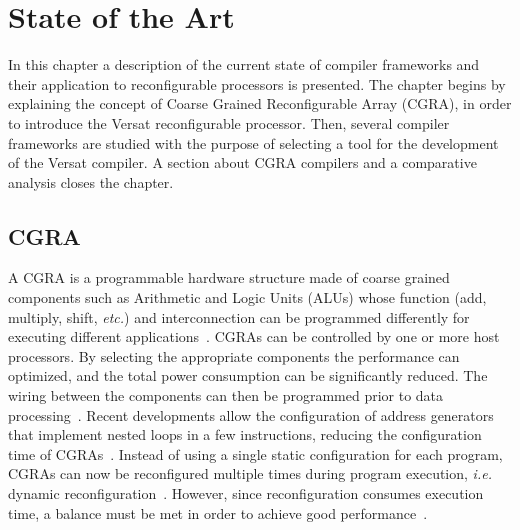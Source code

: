 
\chapter{State of the Art} %
\label{chapter:estadodaarte}

In this chapter a description of the current state of compiler frameworks and
their application to reconfigurable processors is presented. The chapter begins
by explaining the concept of Coarse Grained Reconfigurable Array ({\sc CGRA}), in
order to introduce the Versat reconfigurable processor. Then, several compiler
frameworks are studied with the purpose of selecting a tool for the development
of the Versat compiler. A section about {\sc CGRA} compilers and a comparative
analysis closes the chapter.


\section{CGRA}

A {\sc CGRA} is a programmable hardware structure made of coarse grained
components such as Arithmetic and Logic Units ({\sc ALUs}) whose function (add,
multiply, shift, {\it etc.}) and
interconnection can be programmed differently for
executing different applications~\cite{Tripp07}. {\sc CGRA}s can be controlled by one
or more host processors. By selecting the appropriate components the performance
can optimized, and the total power consumption can be significantly reduced.  The
wiring between the components can then be programmed prior to data
processing~\cite{Cao17TVLSI,Dave18DAC,Gu18TPDS}.  Recent developments allow the
configuration of address generators that implement nested loops in a few
instructions, reducing the configuration time of {\sc CGRA}s~\cite{deSutter10}.
Instead of using a single static configuration for each program, {\sc CGRA}s can
now be reconfigured multiple times during program execution, {\it i.e.} dynamic
reconfiguration~\cite{Hartenstein01}.  However, since reconfiguration consumes
execution time, a balance must be met in order to achieve good
performance~\cite{Mukherjee17VLSID}.

